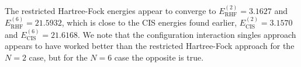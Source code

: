 \documentclass[a4paper]{article}
\begin{document}
The restricted Hartree-Fock energies appear to converge to $E_\text{RHF}^{(2)}=3.1627$ and $E_\text{RHF}^{(6)}=21.5932$, which is close to the CIS energies found earlier, $E_\text{CIS}^{(2)}=3.1570$ and $E_\text{CIS}^{(6)}=21.6168$. We note that the configuration interaction singles approach appears to have worked better than the restricted Hartree-Fock approach for the $N=2$ case, but for the $N=6$ case the opposite is true.
\end{document}
